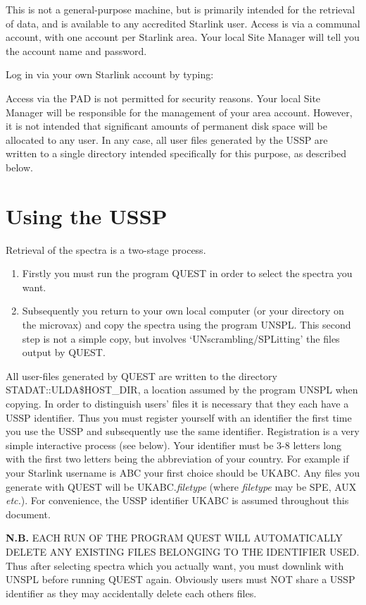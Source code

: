 \documentclass[11pt,nolof,noabs]{starlink}
\begin{document}
This is not a general-purpose machine, but is primarily intended for the
retrieval of data, and is available to any accredited Starlink user.
Access is via a communal account, with one account
per Starlink area.
Your local Site Manager will tell you the account name and password.

Log in via your own Starlink account by typing:
Access via the PAD is not permitted for security reasons.
Your local Site Manager will be responsible for the management
of your area account.
However, it is not intended that significant amounts of permanent
disk space will be allocated to any user.
In any case, all user files generated by the USSP are written
to a single directory intended specifically for this purpose, as described
below.

\section{Using the USSP}

Retrieval of the spectra is a two-stage process.
\begin{enumerate}
\item Firstly you must run the program QUEST in order to
select the spectra you want.
\item Subsequently you return to your own local computer (or your
directory on the microvax) and copy the spectra
using the program UNSPL.
This second step is not a simple copy, but involves `UNscrambling/SPLitting'
the files output by QUEST.
\end{enumerate}
All user-files generated by QUEST are written to the
directory  STADAT::ULDA\$HOST\_DIR,  a location assumed by
the program UNSPL when copying.
In order to distinguish users' files it is necessary that they each have
a USSP identifier.
Thus you must register yourself with an identifier the first time you
use the USSP and subsequently use the same identifier.
Registration is a very simple interactive process (see below).
Your identifier must be 3-8 letters long with the first two letters
being the abbreviation of your country.
For example if your Starlink username is  ABC your first choice
should be UKABC.
Any files you generate with QUEST will be
UKABC.\textit{filetype} (where \textit{filetype} may be SPE, AUX \textit{etc.}).
For convenience, the USSP identifier UKABC is assumed throughout this document.

\textbf{N.B.} EACH RUN OF THE PROGRAM  QUEST WILL AUTOMATICALLY DELETE
ANY EXISTING FILES BELONGING TO THE IDENTIFIER USED.
Thus after selecting spectra which you actually want,  you must downlink with
UNSPL before running QUEST again.
Obviously users must NOT share a USSP identifier as they may accidentally
delete each others files.
\end{document}
